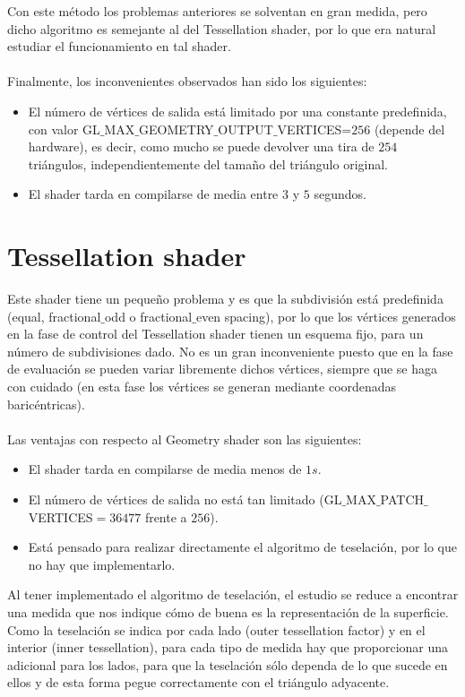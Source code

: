 	Con este método los problemas anteriores se solventan en gran medida, pero dicho algoritmo es semejante al del Tessellation shader, por lo que era natural estudiar el funcionamiento en tal shader.\\
	\\ Finalmente, los inconvenientes observados han sido los siguientes:
	\begin{itemize}
		\item El número de vértices de salida está limitado por una constante predefinida, con valor GL$\_$MAX$\_$GEOMETRY$\_$OUTPUT$\_$VERTICES=$256$ (depende del hardware), es decir, como mucho se puede devolver una tira de $254$ triángulos, independientemente del tamaño del triángulo original.
		\item El shader tarda en compilarse de media entre $3$ y $5$ segundos.
	\end{itemize}
	
\section{Tessellation shader}

	Este shader tiene un pequeño problema y es que la subdivisión está predefinida (equal, fractional$\_$odd o fractional$\_$even spacing), por lo que los vértices generados en la fase de control del Tessellation shader tienen un esquema fijo, para un número de subdivisiones dado. No es un gran inconveniente puesto que en la fase de evaluación se pueden variar libremente dichos vértices, siempre que se haga con cuidado (en esta fase los vértices se generan mediante coordenadas baricéntricas). \\
	\\ Las ventajas con respecto al Geometry shader son las siguientes:
	\begin{itemize}
		\item El shader tarda en compilarse de media menos de $1s$.
		\item El número de vértices de salida no está tan limitado (GL$\_$MAX$\_$PATCH$\_$VERTICES$=36477$ frente a $256$).
		\item Está pensado para realizar directamente el algoritmo de teselación, por lo que no hay que implementarlo.
	\end{itemize}
	
	Al tener implementado el algoritmo de teselación, el estudio se reduce a encontrar una medida que nos indique cómo de buena es la representación de la superficie. Como la teselación se indica por cada lado (outer tessellation factor) y en el interior (inner tessellation), para cada tipo de medida hay que proporcionar una adicional para los lados, para que la teselación sólo dependa de lo que sucede en ellos y de esta forma pegue correctamente con el triángulo adyacente.
	
